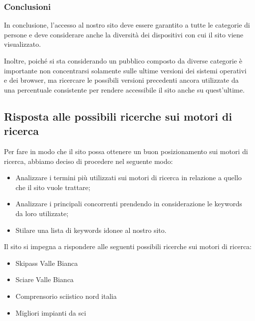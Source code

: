 \subsubsection{Conclusioni}

In conclusione, l'accesso al nostro sito deve essere garantito a tutte le categorie di persone e deve considerare anche la diversità
dei dispositivi con cui il sito viene visualizzato.

Inoltre, poiché si sta considerando un pubblico composto da diverse categorie è importante non concentrarsi solamente sulle ultime versioni
dei sistemi operativi e dei browser, ma ricercare le possibili versioni precedenti ancora utilizzate da una percentuale consistente per rendere
accessibile il sito anche su quest'ultime.

\subsection{Risposta alle possibili ricerche sui motori di ricerca}

Per fare in modo che il sito possa ottenere un buon posizionamento sui motori di ricerca, abbiamo deciso di procedere nel seguente modo:
\begin{itemize}
    \item Analizzare i termini più utilizzati sui motori di ricerca in relazione a quello che il sito vuole trattare;
    \item Analizzare i principali concorrenti prendendo in considerazione le keywords da loro utilizzate;
    \item Stilare una lista di keywords idonee al nostro sito.
\end{itemize}

Il sito si impegna a rispondere alle seguenti possibili ricerche sui motori di ricerca:
\begin{itemize}
    \item Skipass Valle Bianca
    \item Sciare Valle Bianca
    \item Comprensorio sciistico nord italia
    \item Migliori impianti da sci
\end{itemize}
